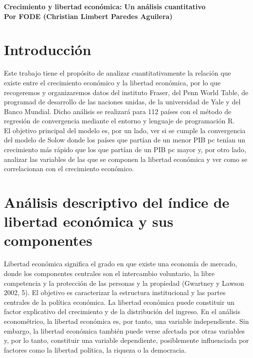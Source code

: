 \begin{center}
\textbf{\Large Crecimiento y libertad económica: Un análisis cuantitativo}\\
\vspace{0.5cm}
\textbf{Por FODE (Christian Limbert Paredes Aguilera)}\\
\end{center}
\vspace{1cm}

    \section*{Introducción}
    Este trabajo tiene el propósito de analizar cuantitativamente la relación que existe entre el crecimiento económico y la libertad económica, por lo que recogeremos y organizaremos datos del instituto Fraser, del Penn World Table, de programad de desarrollo de las naciones unidas, de la universidad de Yale y del Banco Mundial. Dicho análisis se realizará para 112 países con el método de regresión de convergencia mediante  el entorno y lenguaje de programación R.\\
    El objetivo principal del modelo es, por un lado, ver si se cumple la convergencia del modelo de Solow donde los países que partían de un menor PIB pc tenían un crecimiento más rápido que los que partían de un PIB pc mayor y, por otro lado, analizar las variables de las que se componen la libertad económica y ver como se correlacionan con el crecimiento económico.

    \section*{Análisis descriptivo del índice de libertad económica y sus componentes}

    Libertad económica significa el grado en que existe una economía de mercado, donde los componentes centrales son el intercambio voluntario, la libre competencia y la protección de las personas y la propiedad (Gwartney y Lawson 2002, 5). El objetivo es caracterizar la estructura institucional y las partes centrales de la política económica. La libertad económica puede constituir un factor explicativo del crecimiento y de la distribución del ingreso. En el análisis econométrico, la libertad económica es, por tanto, una variable independiente. Sin embargo, la libertad económica también puede verse afectada por otras variables y, por lo tanto, constituir una variable dependiente, posiblemente influenciada por factores como la libertad política, la riqueza o la democracia.\\

